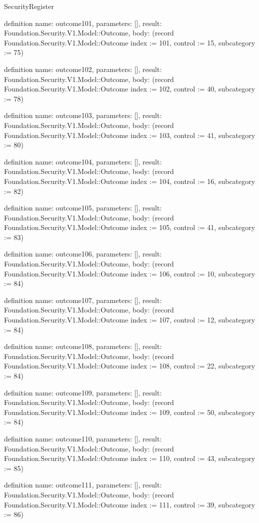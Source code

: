 \begin{lexlean}{SecurityRegister}
\begin{semanticmodule}
definition{
  name: outcome101,
  parameters: [],
  result: Foundation.Security.V1.Model::Outcome,
  body: (record Foundation.Security.V1.Model::Outcome {index := 101, control := 15, subcategory := 75})
}

definition{
  name: outcome102,
  parameters: [],
  result: Foundation.Security.V1.Model::Outcome,
  body: (record Foundation.Security.V1.Model::Outcome {index := 102, control := 40, subcategory := 78})
}

definition{
  name: outcome103,
  parameters: [],
  result: Foundation.Security.V1.Model::Outcome,
  body: (record Foundation.Security.V1.Model::Outcome {index := 103, control := 41, subcategory := 80})
}

definition{
  name: outcome104,
  parameters: [],
  result: Foundation.Security.V1.Model::Outcome,
  body: (record Foundation.Security.V1.Model::Outcome {index := 104, control := 16, subcategory := 82})
}

definition{
  name: outcome105,
  parameters: [],
  result: Foundation.Security.V1.Model::Outcome,
  body: (record Foundation.Security.V1.Model::Outcome {index := 105, control := 41, subcategory := 83})
}

definition{
  name: outcome106,
  parameters: [],
  result: Foundation.Security.V1.Model::Outcome,
  body: (record Foundation.Security.V1.Model::Outcome {index := 106, control := 10, subcategory := 84})
}

definition{
  name: outcome107,
  parameters: [],
  result: Foundation.Security.V1.Model::Outcome,
  body: (record Foundation.Security.V1.Model::Outcome {index := 107, control := 12, subcategory := 84})
}

definition{
  name: outcome108,
  parameters: [],
  result: Foundation.Security.V1.Model::Outcome,
  body: (record Foundation.Security.V1.Model::Outcome {index := 108, control := 22, subcategory := 84})
}

definition{
  name: outcome109,
  parameters: [],
  result: Foundation.Security.V1.Model::Outcome,
  body: (record Foundation.Security.V1.Model::Outcome {index := 109, control := 50, subcategory := 84})
}

definition{
  name: outcome110,
  parameters: [],
  result: Foundation.Security.V1.Model::Outcome,
  body: (record Foundation.Security.V1.Model::Outcome {index := 110, control := 43, subcategory := 85})
}

definition{
  name: outcome111,
  parameters: [],
  result: Foundation.Security.V1.Model::Outcome,
  body: (record Foundation.Security.V1.Model::Outcome {index := 111, control := 39, subcategory := 86})
}


\end{semanticmodule}
\end{lexlean}
